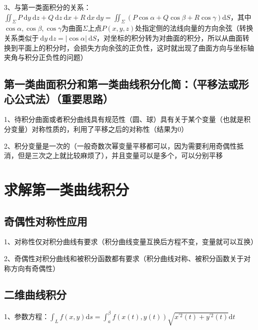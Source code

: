 3、与第一类面积分的关系：$\iint_{\Sigma} P \mathrm{~d} y \mathrm{~d} z+Q \mathrm{~d} z \mathrm{~d} x+R \mathrm{~d} x \mathrm{~d} y=\iint_{\Sigma}(P \cos \alpha+Q \cos \beta+R \cos \gamma) \mathrm{d} S$，其中$\cos \alpha, \cos \beta, \cos \gamma$为曲面$\Sigma$上点$P(x, y, z)$处指定侧的法线向量的方向余弦（转换关系类似于$\mathrm{~d} y \mathrm{~d} z = |\cos \alpha| \ \mathrm{d} S$，对坐标的积分转为对曲面的积分，所以从曲面转换到平面上的积分时，会损失方向余弦的正负性，这时就出现了曲面方向与坐标轴夹角与积分正负性的问题）



\subsection{第一类曲面积分和第一类曲线积分化简：（平移法或形心公式法）（重要思路）}

1、待积分曲面或者积分曲线具有规范性（圆、球）具有关于某个变量（也就是积分变量）对称性质的，利用了平移之后的对称性（结果为0）

2、积分变量是一次的（一般奇数次幂变量平移都可以，因为需要利用奇偶性抵消，但是三次之上就比较麻烦了），并且变量可以是多个，可以分别平移

\section{求解第一类曲线积分}



\subsection{奇偶性对称性应用}

1、对称性仅对积分曲线有要求（积分曲线变量互换后方程不变，变量就可以互换）

2、奇偶性对积分曲线和被积分函数都有要求（积分曲线对称、被积分函数关于对称方向有奇偶性）



\subsection{二维曲线积分}

1、参数方程：$\int_{L} f(x, y) \mathrm{d} s=\int_{a}^{\beta} f(x(t), y(t)) \sqrt{x^{\prime 2}(t)+y^{\prime 2}(t)} \mathrm{d} t$

